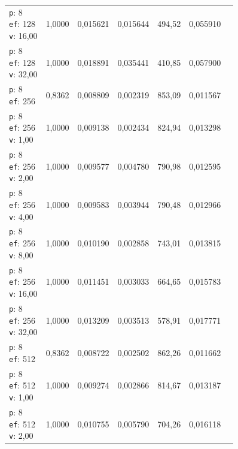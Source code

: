 \begin{table}[htbp]
\begin{tabularx}{\textwidth}{Xrrrrrr}
    \makecell{\texttt{p}: 8\\\texttt{ef}: 128\\\texttt{v}: 16,00} & 1,0000 & 0,015621 & 0,015644 & 494,52 & 0,055910 \\
    \makecell{\texttt{p}: 8\\\texttt{ef}: 128\\\texttt{v}: 32,00} & 1,0000 & 0,018891 & 0,035441 & 410,85 & 0,057900 \\
    \makecell{\texttt{p}: 8\\\texttt{ef}: 256} & 0,8362 & 0,008809 & 0,002319 & 853,09 & 0,011567 \\
    \makecell{\texttt{p}: 8\\\texttt{ef}: 256\\\texttt{v}: 1,00} & 1,0000 & 0,009138 & 0,002434 & 824,94 & 0,013298 \\
    \makecell{\texttt{p}: 8\\\texttt{ef}: 256\\\texttt{v}: 2,00} & 1,0000 & 0,009577 & 0,004780 & 790,98 & 0,012595 \\
    \makecell{\texttt{p}: 8\\\texttt{ef}: 256\\\texttt{v}: 4,00} & 1,0000 & 0,009583 & 0,003944 & 790,48 & 0,012966 \\
    \makecell{\texttt{p}: 8\\\texttt{ef}: 256\\\texttt{v}: 8,00} & 1,0000 & 0,010190 & 0,002858 & 743,01 & 0,013815 \\
    \makecell{\texttt{p}: 8\\\texttt{ef}: 256\\\texttt{v}: 16,00} & 1,0000 & 0,011451 & 0,003033 & 664,65 & 0,015783 \\
    \makecell{\texttt{p}: 8\\\texttt{ef}: 256\\\texttt{v}: 32,00} & 1,0000 & 0,013209 & 0,003513 & 578,91 & 0,017771 \\
    \makecell{\texttt{p}: 8\\\texttt{ef}: 512} & 0,8362 & 0,008722 & 0,002502 & 862,26 & 0,011662 \\
    \makecell{\texttt{p}: 8\\\texttt{ef}: 512\\\texttt{v}: 1,00} & 1,0000 & 0,009274 & 0,002866 & 814,67 & 0,013187 \\
    \makecell{\texttt{p}: 8\\\texttt{ef}: 512\\\texttt{v}: 2,00} & 1,0000 & 0,010755 & 0,005790 & 704,26 & 0,016118 \\

\end{tabularx}
\end{table}
